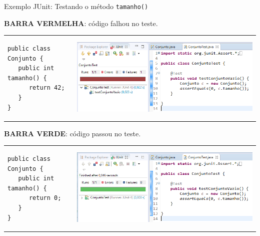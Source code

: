 \documentclass[handout]{beamer}
\begin{document}
\begin{frame}[fragile]{Exemplo JUnit: Testando o método \texttt{tamanho()}}

\textcolor[rgb]{.5,0,0}{\bf BARRA VERMELHA}: código falhou no teste.

\begin{tabular}{ll}
\begin{minipage}{.45\textwidth}
\begin{lstlisting}
public class Conjunto {
   public int tamanho() {
      return 42;
   }
}
\end{lstlisting} 
\end{minipage} & 
\includegraphics[width=.45\textwidth]{falhaConjunto.png} \\
\end{tabular}

\textcolor[rgb]{0,.5,0}{\bf BARRA VERDE}: código passou no teste.

\begin{tabular}{ll}
\begin{minipage}{.45\textwidth}
\begin{lstlisting}
public class Conjunto {
   public int tamanho() {
      return 0;
   }
}
\end{lstlisting} 
\end{minipage} & 
\includegraphics[width=.45\textwidth]{passaConjunto.png} \\
\end{tabular}

\end{frame}
\end{document}
